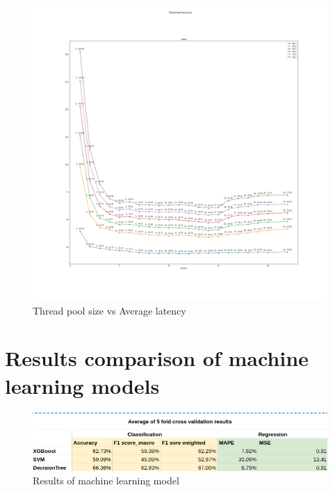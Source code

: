 \begin{figure}[htbp]
	\begin{center}
		\includegraphics[scale=0.2]{figures/thread_pool_test_1.png}
	\end{center}
	\caption{Thread pool size vs Average latency}
	\label{thread_pool_test_1}
\end{figure}

\section{Results comparison of machine learning models}


\begin{figure}[htbp]
	\begin{center}
		\includegraphics[scale=0.5]{figures/ml_results.png}
	\end{center}
	\caption{Results of machine learning model}
	\label{ml_results}
\end{figure}

